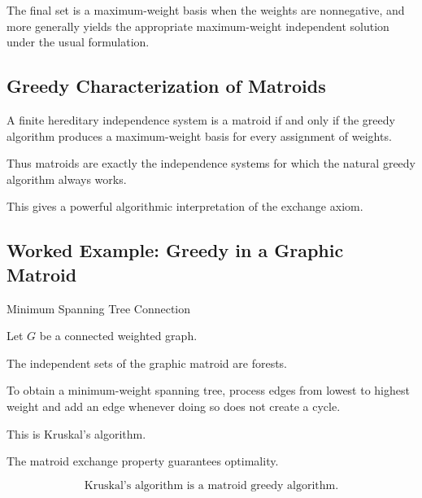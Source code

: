 The final set is a maximum-weight basis when the weights are
nonnegative, and more generally yields the appropriate maximum-weight
independent solution under the usual formulation.

\subsection{Greedy Characterization of Matroids}
\label{subsec:greedy-characterization-matroids}

\begin{theorem}
A finite hereditary independence system is a matroid if and only if the
greedy algorithm produces a maximum-weight basis for every assignment
of weights.
\end{theorem}

Thus matroids are exactly the independence systems for which the
natural greedy algorithm always works.

This gives a powerful algorithmic interpretation of the exchange axiom.

\subsection{Worked Example: Greedy in a Graphic Matroid}
\label{subsec:worked-greedy-graphic}

\begin{workedexamplebox}{Minimum Spanning Tree Connection}

Let \(G\) be a connected weighted graph.

The independent sets of the graphic matroid are forests.

To obtain a minimum-weight spanning tree, process edges from lowest to
highest weight and add an edge whenever doing so does not create a
cycle.

This is Kruskal's algorithm.

The matroid exchange property guarantees optimality.

\begin{answerbox}
\[
\boxed{
\text{Kruskal's algorithm is a matroid greedy algorithm.}
}
\]
\end{answerbox}

\end{workedexamplebox}

